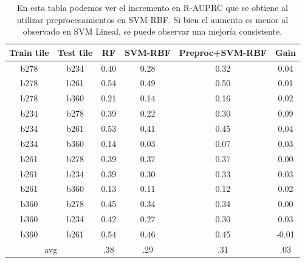 \begin{table}[h!]
\centering
\begin{tabular}{|c|c|c|c|c|c|}
\hline
\textbf{Train tile} & \textbf{Test tile} & \textbf{RF} & \textbf{SVM-RBF} & \textbf{Preproc+SVM-RBF} & \textbf{Gain}              \\ \hline
b278                & b234               & 0.40        & 0.28             & 0.32                     & 0.04                       \\ \hline
b278                & b261               & 0.54        & 0.49             & 0.50                     & 0.01                       \\ \hline
b278                & b360               & 0.21        & 0.14             & 0.16                     & 0.02                       \\ \hline
b234                & b278               & 0.39        & 0.22             & 0.30                     & 0.09                       \\ \hline
b234                & b261               & 0.53        & 0.41             & 0.45                     & 0.04                       \\ \hline
b234                & b360               & 0.14        & 0.03             & 0.07                     & 0.03                       \\ \hline
b261                & b278               & 0.39        & 0.37             & 0.37                     & 0.00                       \\ \hline
b261                & b234               & 0.39        & 0.30             & 0.33                     & 0.03                       \\ \hline
b261                & b360               & 0.13        & 0.11             & 0.12                     & 0.02                       \\ \hline
b360                & b278               & 0.45        & 0.34             & 0.34                     & 0.00                       \\ \hline
b360                & b234               & 0.42        & 0.27             & 0.30                     & 0.03                       \\ \hline
b360                & b261               & 0.54        & 0.46             & 0.45                     & -0.01                      \\ \hline
\multicolumn{2}{|c|}{avg}                & .38         & .29              & .31                      & {\color[HTML]{009901} .03} \\ \hline
\end{tabular}
\caption{ En esta tabla podemos ver el incremento en R-AUPRC que se obtiene al utilizar preprocesamientos en SVM-RBF. Si bien el aumento es menor al observado en SVM Lineal, se puede observar una mejoría consistente. }
\label{tab:rbf-gain-preproc}
\end{table}